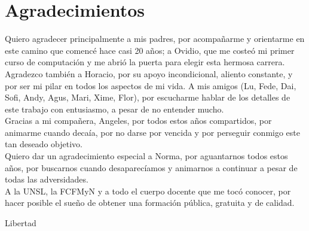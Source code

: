 \chapter*{Agradecimientos}

Quiero agradecer principalmente a mis padres, por acompañarme y orientarme en este camino que comenc\'e hace casi 20 a\~nos; a Ovidio, que me coste\'o mi primer curso de computaci\'on y me abri\'o la puerta para elegir esta hermosa carrera. \\

Agradezco tambi\'en a Horacio, por su apoyo incondicional, aliento constante, y por ser mi pilar en todos los aspectos de mi vida. A mis amigos (Lu, Fede, Dai, Sofi, Andy, Agus, Mari, Xime, Flor), por escucharme hablar de los detalles de este trabajo con entusiasmo, a pesar de no entender mucho. \\

Gracias a mi compa\~nera, Angeles, por todos estos a\~nos compartidos, por animarme cuando deca\'ia, por no darse por vencida y por perseguir conmigo este tan deseado objetivo. \\

Quiero dar un agradecimiento especial a Norma, por aguantarnos todos estos a\~nos, por buscarnos cuando desaparec\'iamos y animarnos a continuar a pesar de todas las adversidades. \\

A la UNSL, la FCFMyN y a todo el cuerpo docente que me toc\'o conocer, por hacer posible el sue\~no de obtener una formaci\'on p\'ublica, gratuita y de calidad.

\begin{flushright}
Libertad
\end{flushright}
